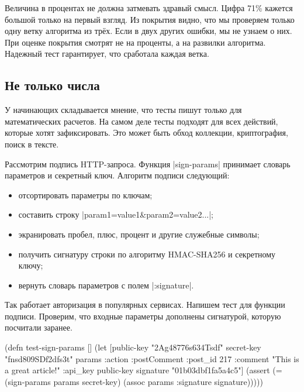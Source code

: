 Величина в процентах не должна затмевать здравый смысл. Цифра 71\% кажется
большой только на первый взгляд. Из покрытия видно, что мы проверяем только одну
ветку алгоритма из трёх. Если в двух других ошибки, мы не узнаем о них. При
оценке покрытия смотрят не на проценты, а на развилки алгоритма. Надежный тест
гарантирует, что сработала каждая ветка.

\subsection{Не только числа}

У начинающих складывается мнение, что тесты пишут только для математических
расчетов. На самом деле тесты подходят для всех действий, которые хотят
зафиксировать. Это может быть обход коллекции, криптография, поиск в тексте.

Рассмотрим подпись HTTP-запроса. Функция \spverb|sign-params| принимает словарь
параметров и секретный ключ. Алгоритм подписи следующий:

\begin{itemize}


\item
  отсортировать параметры по ключам;

\item
  составить строку \spverb|param1=value1&param2=value2...|;

\item
  экранировать пробел, плюс, процент и другие служебные символы;

\item
  получить сигнатуру строки по алгоритму HMAC-SHA256 и секретному ключу;

\item
  вернуть словарь параметров с полем \spverb|:signature|.

\end{itemize}


Так работает авторизация в популярных сервисах. Напишем тест для функции
подписи. Проверим, что входные параметры дополнены сигнатурой, которую посчитали
заранее.

\begin{english}
  \begin{clojure}
(defn test-sign-params []
  (let [public-key "2Ag48776s634Tsdf"
        secret-key "fnsd809SDf2dfs3t"
        params {:action :postComment
                :post_id 217
                :comment "This is a great article!"
                :api_key public-key}
        signature "01b03dbf1fa5a4c5"]
    (assert (= (sign-params params secret-key)
               (assoc params :signature signature)))))
  \end{clojure}
\end{english}

